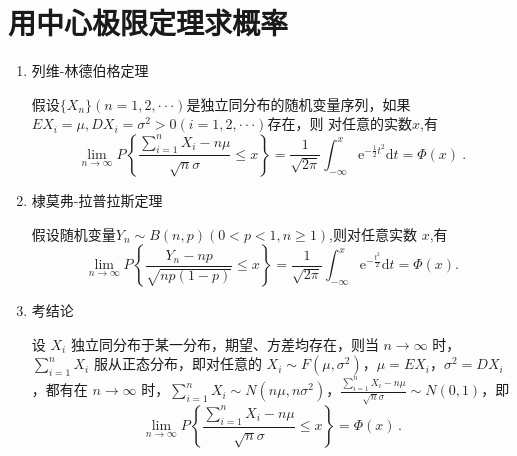 \section{用中心极限定理求概率}
\begin{enumerate}
      \item 列维-林德伯格定理

            假设$\{X_n\}(n=1,2,\cdotp\cdotp\cdotp)$是独立同分布的随机变量序列，如果$EX_i=\mu,DX_i=\sigma^2>0(i=1,2,\cdotp\cdotp\cdotp)$存在，则
            对任意的实数$x$,有
            $$\lim_{n\to\infty}P\left\{\frac{\sum_{i=1}^{n}X_{i}-n\mu}{\sqrt{n}\sigma}\leqslant x\right\}=\frac{1}{\sqrt{2\pi}}\int_{-\infty}^{x}\mathrm{e}^{-\frac{1}{2}t^{2}}\mathrm{d}t=\Phi(x)\:.$$
      \item 棣莫弗-拉普拉斯定理

            假设随机变量$Y_n\sim B(n,p)(0<p<1,n\geqslant1)$,则对任意实数 $x$,有
            $$\lim_{n\to\infty}P\left\{\frac{Y_{n}-np}{\sqrt{np(1-p)}}\leqslant x\right\}=\frac{1}{\sqrt{2\pi}}\int_{-\infty}^{x}\mathrm{e}^{-\frac{t^{2}}{2}}\mathrm{d}t=\Phi(x).$$
      \item 考结论

            设 $X_i$ 独立同分布于某一分布，期望、方差均存在，则当 $n \to \infty$ 时，$\sum_{i=1}^{n} X_i$ 服从正态分布，即对任意的 $X_i \sim F(\mu, \sigma^2)$，$\mu = EX_i$，$\sigma^2 = DX_i$，都有在 $n \to \infty$ 时，$\sum_{i=1}^{n} X_i \sim N(n\mu, n\sigma^2)$，$\frac{\sum_{i=1}^{n} X_i - n\mu}{\sqrt{n}\sigma} \sim N(0, 1)$，即
            $$\lim_{n \to \infty} P\left\{ \frac{\sum_{i=1}^{n} X_i - n\mu}{\sqrt{n}\sigma} \leqslant x \right\} = \Phi(x) \, .$$
\end{enumerate}

